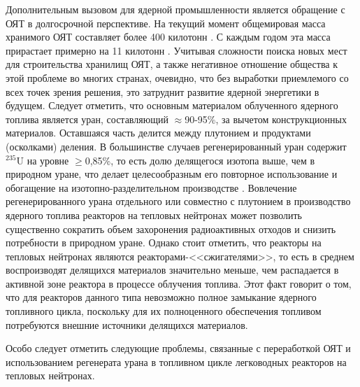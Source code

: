 Дополнительным вызовом для ядерной промышленности является обращение с ОЯТ в долгосрочной перспективе. На текущий момент общемировая масса хранимого ОЯТ составляет более 400 килотонн \cite{kaygorodcevProblemyPerspektivyRazvitiya2021}. С каждым годом эта масса прирастает примерно на 11 килотонн \cite{UseReprocessedUranium2019}. Учитывая сложности поиска новых мест для строительства хранилищ ОЯТ, а также негативное отношение общества к этой проблеме во многих странах, очевидно, что без выработки приемлемого со всех точек зрения решения, это затруднит развитие ядерной энергетики в будущем. 
Следует отметить, что основным материалом облученного ядерного топлива является уран, составляющий $\approx$90-95\%, за вычетом конструкционных материалов. Оставшаяся часть делится между плутонием и продуктами (осколками) деления. В большинстве случаев регенерированный уран содержит $^{235}$U на уровне $\geq$0,85\%, то есть долю делящегося изотопа выше, чем в природном уране, что делает целесообразным его повторное использование и обогащение на изотопно-разделительном производстве  \cite{NikipelovNikipelovSudby}. Вовлечение регенерированного урана отдельного или совместно с плутонием в производство ядерного топлива реакторов на тепловых нейтронах может позволить существенно сократить объем захоронения радиоактивных отходов и снизить потребности в природном уране. Однако стоит отметить, что реакторы на тепловых нейтронах являются реакторами-<<сжигателями>>, то есть в среднем воспроизводят делящихся материалов значительно меньше, чем распадается в активной зоне реактора в процессе облучения топлива. Этот факт говорит о том, что для реакторов данного типа невозможно полное замыкание ядерного топливного цикла, поскольку для их полноценного обеспечения топливом потребуются внешние источники делящихся материалов.

Особо следует отметить следующие проблемы, связанные с переработкой ОЯТ и использованием регенерата урана в топливном цикле легководных реакторов на тепловых нейтронах.

